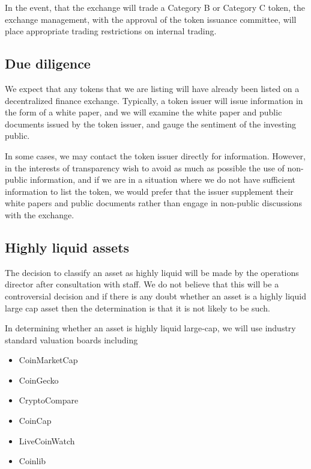 In the event, that the exchange will trade a Category B or Category C
token, the exchange management, with the approval of the token issuance
committee, will place appropriate trading restrictions on internal
trading.


\subsection{Due diligence}

We expect that any tokens that we are listing will have already been
listed on a decentralized finance exchange.  Typically, a token issuer
will issue information in the form of a white paper, and we will
examine the white paper and public documents issued by the token
issuer, and gauge the sentiment of the investing public.

In some cases, we may contact the token issuer directly for
information.  However, in the interests of transparency wish to avoid
as much as possible the use of non-public information, and if we are
in a situation where we do not have sufficient information to list the
token, we would prefer that the issuer supplement their white papers
and public documents rather than engage in non-public discussions with
the exchange.

\subsection{Highly liquid assets}

The decision to classify an asset as highly liquid will be made by the
operations director after consultation with staff.  We do not believe
that this will be a controversial decision and if there is any doubt
whether an asset is a highly liquid large cap asset then
the determination is that it is not likely to be such.

In determining whether an asset is highly liquid large-cap, we will
use industry standard valuation boards including
\begin{itemize}
\item CoinMarketCap
\item CoinGecko
\item CryptoCompare
\item CoinCap
\item LiveCoinWatch
\item Coinlib
\end{itemize}

